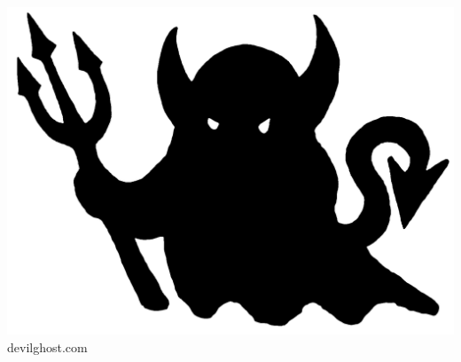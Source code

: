 \documentclass[fontsize=9pt,twoside]{scrreprt}
\newcommand{\blankpage}{
    \newpage
    \thispagestyle{empty}
    \mbox{}
    \newpage
}
\begin{document}
\begin{titlepage}
\begin{center}
    \vspace{4ex}
	\includegraphics[scale=.125]{img/devilghost.png} \\
	\footnotesize devilghost.com
    \end{center}
\end{titlepage}
\clearpage

\blankpage

\renewcommand\thepage{}
\thispagestyle{empty}
{\small \tableofcontents}
\clearpage
\renewcommand\thepage{\arabic{page}}


\end{document}
